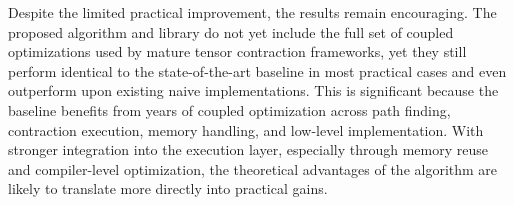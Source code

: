 Despite the limited practical improvement, the results remain encouraging. The proposed algorithm and library do not yet include the full set of coupled optimizations used by mature tensor contraction frameworks, yet they still perform identical to the state-of-the-art baseline in most practical cases and even outperform upon existing naive implementations. This is significant because the baseline benefits from years of coupled optimization across path finding, contraction execution, memory handling, and low-level implementation. With stronger integration into the execution layer, especially through memory reuse and compiler-level optimization, the theoretical advantages of the algorithm are likely to translate more directly into practical gains.